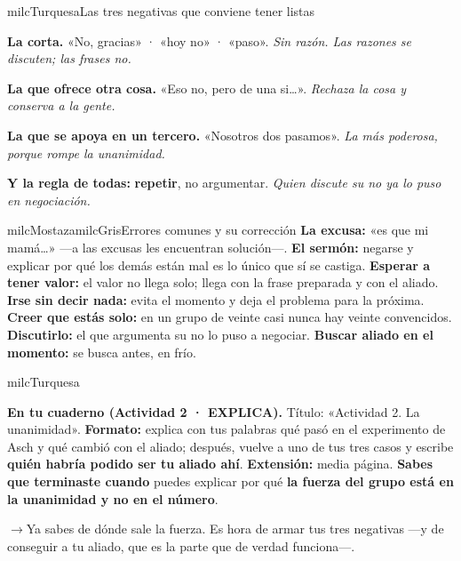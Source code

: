 \documentclass[11pt,letterpaper]{article}
\newcommand{\puente}[1]{%
  \begin{puentebox}%
    \textcolor{milcGradeDark}{$\rightarrow$}\hspace{2mm}#1%
  \end{puentebox}%
}
\begin{document}
\begin{drawbox}{milcTurquesa}{Las tres negativas que conviene tener listas}
\begin{pasoslista}
\item \textbf{La corta.} «No, gracias» · «hoy no» · «paso». \emph{Sin razón. Las razones se discuten; las frases no.}
\item \textbf{La que ofrece otra cosa.} «Eso no, pero de una si\ldots». \emph{Rechaza la cosa y conserva a la gente.}
\item \textbf{La que se apoya en un tercero.} «Nosotros dos pasamos». \emph{La más poderosa, porque rompe la unanimidad.}
\item \textbf{Y la regla de todas:} \textbf{repetir}, no argumentar. \emph{Quien discute su no ya lo puso en negociación.}
\end{pasoslista}
\end{drawbox}

\begin{softbox}{milcMostaza}{milcGris}{Errores comunes y su corrección}
\textbf{La excusa:} «es que mi mamá\ldots» ---a las excusas les encuentran solución---. \textbf{El sermón:} negarse y explicar por qué los demás están mal es lo único que sí se castiga. \textbf{Esperar a tener valor:} el valor no llega solo; llega con la frase preparada y con el aliado. \textbf{Irse sin decir nada:} evita el momento y deja el problema para la próxima. \textbf{Creer que estás solo:} en un grupo de veinte casi nunca hay veinte convencidos. \textbf{Discutirlo:} el que argumenta su no lo puso a negociar. \textbf{Buscar aliado en el momento:} se busca antes, en frío.
\end{softbox}

\begin{infoband}{milcTurquesa}


\textbf{En tu cuaderno (Actividad 2 · EXPLICA).} Título: «Actividad 2. La unanimidad». \textbf{Formato:} explica con tus palabras qué pasó en el experimento de Asch y qué cambió con el aliado; después, vuelve a uno de tus tres casos y escribe \textbf{quién habría podido ser tu aliado ahí}. \textbf{Extensión:} media página. \textbf{Sabes que terminaste cuando} puedes explicar por qué \textbf{la fuerza del grupo está en la unanimidad y no en el número}.
\end{infoband}

\puente{Ya sabes de dónde sale la fuerza. Es hora de armar tus tres negativas ---y de conseguir a tu aliado, que es la parte que de verdad funciona---.}
\end{document}
